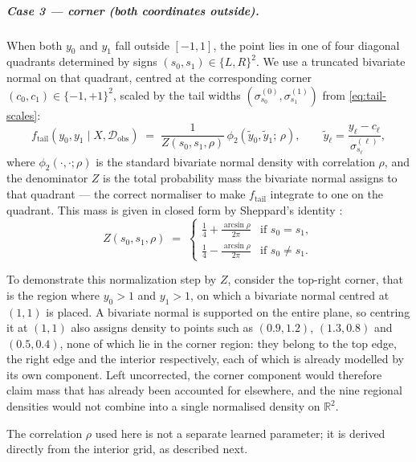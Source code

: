 \documentclass[11pt]{article}
\theoremstyle{plain}
\theoremstyle{definition}
\theoremstyle{remark}
\begin{document}
\subparagraph{Case 3 --- corner (both coordinates outside).}
When both $y_0$ and $y_1$ fall outside $[-1, 1]$, the point lies in
one of four diagonal quadrants determined by signs
$(s_0, s_1) \in \{L, R\}^{2}$. We use a truncated bivariate normal on
that quadrant, centred at the corresponding corner
$(c_0, c_1) \in \{-1, +1\}^{2}$, scaled by the tail widths
$(\sigma_{s_0}^{(0)}, \sigma_{s_1}^{(1)})$ from \eqref{eq:tail-scales}:
\begin{equation}
  f_{\mathrm{tail}}(y_0, y_1 \mid X, \mathcal{D}_{\mathrm{obs}})
  \;=\;
  \frac{1}{Z(s_0, s_1, \rho)}\,
  \phi_{2}\!\left(\tilde{y}_0, \tilde{y}_1;\, \rho\right),
  \qquad
  \tilde{y}_\ell = \frac{y_\ell - c_\ell}{\sigma_{s_\ell}^{(\ell)}},
  \label{eq:tail-density}
\end{equation}
where $\phi_{2}(\cdot, \cdot; \rho)$ is the standard bivariate normal
density with correlation $\rho$, and the denominator $Z$ is the total
probability mass the bivariate normal assigns to that quadrant --- the
correct normaliser to make $f_{\mathrm{tail}}$ integrate to one on the
quadrant. This mass is given in closed form by Sheppard's identity
\citep{sheppard1899application}:
\begin{equation}
  Z(s_0, s_1, \rho)
  \;=\;
  \begin{cases}
    \tfrac{1}{4} + \tfrac{\arcsin\rho}{2\pi}
      & \text{if } s_0 = s_1, \\[4pt]
    \tfrac{1}{4} - \tfrac{\arcsin\rho}{2\pi}
      & \text{if } s_0 \ne s_1.
  \end{cases}
  \label{eq:sheppard}
\end{equation}

To demonstrate this normalization step by $Z$, consider the top-right corner, that is the region
where $y_0 > 1$ and $y_1 > 1$, on which a bivariate normal centred at $(1,1)$ is placed. A bivariate normal is supported on the entire plane, so centring it at $(1,1)$ also assigns density to points such as $(0.9, 1.2)$, $(1.3, 0.8)$ and $(0.5, 0.4)$, none of which lie in the corner region: they belong to the top edge, the right edge and the
interior respectively, each of which is already modelled by its own component. Left uncorrected, the corner component would therefore claim mass that has already been accounted for elsewhere, and the nine
regional densities would not combine into a single normalised density on
$\mathbb{R}^2$. 

The correlation $\rho$ used here is not a separate learned parameter;
it is derived directly from the interior grid, as described next.
\end{document}
